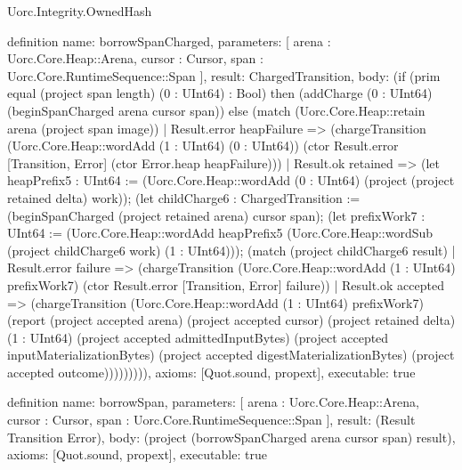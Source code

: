 \begin{lexlean}{Uorc.Integrity.OwnedHash}
\begin{semanticmodule}
definition{
  name: borrowSpanCharged,
  parameters: [
    arena : Uorc.Core.Heap::Arena,
    cursor : Cursor,
    span : Uorc.Core.RuntimeSequence::Span
  ],
  result: ChargedTransition,
  body: (if (prim equal (project span length) (0 : UInt64) : Bool) then (addCharge (0 : UInt64) (beginSpanCharged arena cursor span)) else (match (Uorc.Core.Heap::retain arena (project span image))
    | Result.error heapFailure => (chargeTransition (Uorc.Core.Heap::wordAdd (1 : UInt64) (0 : UInt64)) (ctor Result.error [Transition, Error] (ctor Error.heap heapFailure)))
    | Result.ok retained => (let heapPrefix5 : UInt64 := (Uorc.Core.Heap::wordAdd (0 : UInt64) (project (project retained delta) work)); (let childCharge6 : ChargedTransition := (beginSpanCharged (project retained arena) cursor span); (let prefixWork7 : UInt64 := (Uorc.Core.Heap::wordAdd heapPrefix5 (Uorc.Core.Heap::wordSub (project childCharge6 work) (1 : UInt64))); (match (project childCharge6 result)
      | Result.error failure => (chargeTransition (Uorc.Core.Heap::wordAdd (1 : UInt64) prefixWork7) (ctor Result.error [Transition, Error] failure))
      | Result.ok accepted => (chargeTransition (Uorc.Core.Heap::wordAdd (1 : UInt64) prefixWork7) (report (project accepted arena) (project accepted cursor) (project retained delta) (1 : UInt64) (project accepted admittedInputBytes) (project accepted inputMaterializationBytes) (project accepted digestMaterializationBytes) (project accepted outcome))))))))),
  axioms: [Quot.sound, propext],
  executable: true
}

definition{
  name: borrowSpan,
  parameters: [
    arena : Uorc.Core.Heap::Arena,
    cursor : Cursor,
    span : Uorc.Core.RuntimeSequence::Span
  ],
  result: (Result Transition Error),
  body: (project (borrowSpanCharged arena cursor span) result),
  axioms: [Quot.sound, propext],
  executable: true
}


\end{semanticmodule}
\end{lexlean}
